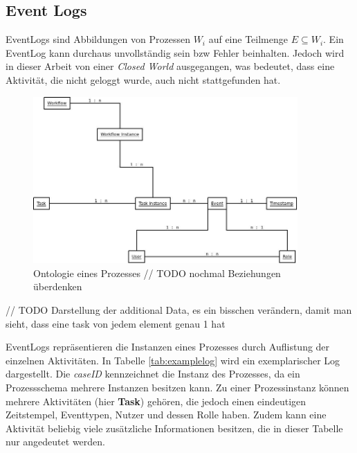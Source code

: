\cite{warner_inter_instance}

\subsection{Event Logs}

EventLogs sind Abbildungen von Prozessen $W_i$ auf eine Teilmenge $E \subseteq W_i$. Ein EventLog kann durchaus unvollständig sein bzw Fehler beinhalten. Jedoch wird in dieser Arbeit von einer \textit{Closed World} ausgegangen, was bedeutet, dass eine Aktivität, die nicht geloggt wurde, auch nicht stattgefunden hat.


\begin{figure}[h!]
	\centering
  \includegraphics[width=0.9\textwidth]{Figures/WorkflowOntology}
	\caption{Ontologie eines Prozesses // TODO nochmal Beziehungen überdenken}
	\label{fig:ontology}
\end{figure}

// TODO Darstellung der additional Data, es ein bisschen verändern, damit man sieht, dass eine task von jedem element genau 1 hat

EventLogs repräsentieren die Instanzen eines Prozesses durch Auflistung der einzelnen Aktivitäten. In Tabelle \ref{tab:examplelog} wird ein exemplarischer Log dargestellt. Die \textit{caseID} kennzeichnet die Instanz des Prozesses, da ein Prozessschema mehrere Instanzen besitzen kann. Zu einer Prozessinstanz können mehrere Aktivitäten (hier \textbf{Task}) gehören, die jedoch einen eindeutigen Zeitstempel, Eventtypen, Nutzer und dessen Rolle haben. Zudem kann eine Aktivität beliebig viele zusätzliche Informationen besitzen, die in dieser Tabelle nur angedeutet werden.

